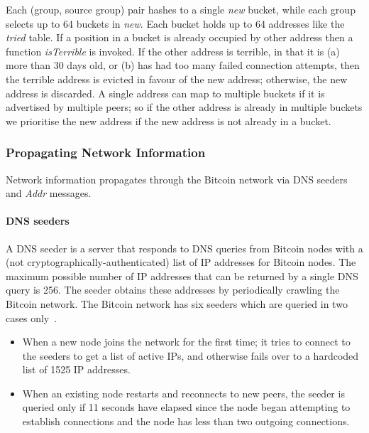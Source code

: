 Each (group, source group) pair hashes to a single \emph{new} bucket, while each group selects up to 64 buckets in \emph{new}. Each bucket holds up to 64 addresses like the \emph{tried} table. If a position in a bucket is already occupied by other address then a function \textsl{isTerrible} is invoked. If the other address is terrible, in that it is (a) more than 30 days old, or (b) has had too many failed connection attempts, then the terrible address is evicted in favour of the new address; otherwise, the new address is discarded. A single address can map to multiple buckets if it is advertised by multiple peers; so if the other address is already in multiple buckets we prioritise the new address if the new address is not already in a bucket.

\subsubsection{Propagating Network Information}

Network information propagates through the Bitcoin network via DNS seeders and \textsl{Addr} messages.
\paragraph*{DNS seeders}
A DNS seeder is a server that responds to DNS queries from Bitcoin nodes with a (not cryptographically-authenticated) list of IP addresses for Bitcoin nodes. The maximum possible number of IP addresses that can be returned by a single DNS query is 256. The seeder obtains these addresses by periodically crawling the Bitcoin network. The Bitcoin network has six seeders which are queried in two cases only~\cite{heilman2015eclipse}.
\begin{itemize}
  \item When a new node joins the network for the first time; it tries to connect to the seeders to get a list of active IPs, and otherwise fails over to a hardcoded list of 1525 IP addresses.
  \item When an existing node restarts and reconnects to new peers, the seeder is queried only if 11 seconds have elapsed since the node began attempting to establish connections and the node has less than two outgoing connections.
\end{itemize}

